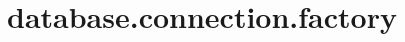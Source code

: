\section{database.connection.factory}
\label{configuration:DatabaseConnectionFactory}
\AvailableInJavaOnly{\TODO}